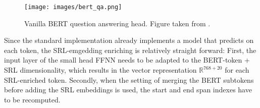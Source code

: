 \begin{wrapfigure}[21]{r}{0.45\linewidth}
  \begin{center}
    \texttt{[image: images/bert\_qa.png]}
  \end{center}
  \caption[BERT Q\&A]{Vanilla BERT question answering head. Figure taken from \citep{devlin2018bert}.}
\end{wrapfigure}

Since the standard implementation already implements a model that predicts on each token,
the SRL-emgedding enriching is relatively straight forward:
First, the input layer of the small head FFNN needs to be adapted to the BERT-token + SRL
dimensionality, which results in the vector representation $\mathbb{R}^{768+20}$ for each
SRL-enriched token. Secondly, when the setting of merging the BERT subtokens before adding
the SRL embeddings is used, the start and end span indexes have to be recomputed.





